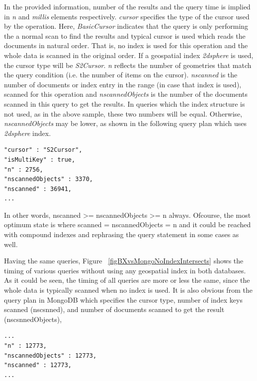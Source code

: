 \documentclass[a4paper,12pt]{article}
\begin{document}
In the provided information, number of the results and the query time is implied in \textit{n} and \textit{millis} elements respectively. \textit{cursor} specifies the type of the cursor used by the operation. Here, \textit{BasicCursor} indicates that the query is only performing the a normal scan to find the results and typical cursor is used which reads the documents in natural order. That is, no index is used for this operation and the whole data is scanned in the original order. If a geospatial index \textit{2dsphere} is used, the cursor type will be \textit{S2Cursor}. \textit{n} reflects the number of geometries that match the query condition (i.e. the number of items on the cursor). \textit{nscanned} is the number of documents or index entry in the range (in case that index is used), scanned for this operation and \textit{nscannedObjects} is the number of the documents scanned in this query to get the results. In queries which the index structure is not used, as in the above sample, these two numbers will be equal. Otherwise, \textit{nscannedObjects} may be lower, as shown in the following query plan which uses \textit{2dsphere} index. 

\begin{verbatim}
"cursor" : "S2Cursor",
"isMultiKey" : true,
"n" : 2756,
"nscannedObjects" : 3370,
"nscanned" : 36941,
...
\end{verbatim}

In other words, nscanned >= nscannedObjects >= n always. Ofcourse, the most optimum state is where scanned = nscannedObjects = n and it could be reached with compound indexes and rephrasing the query statement in some cases as well.

Having the same queries, Figure ~\ref{figBXvsMongoNoIndexIntersects} shows the timing of various queries without using any geospatial index in both databases. As it could be seen, the timing of all queries are more or less the same, since the whole data is typically scanned when no index is used. It is also obvious from the query plan in MongoDB which specifies the cursor type, number of index keys scanned (nscsnned), and number of documents scanned to get the result (nscsnnedObjects),
\begin{verbatim}
...
"n" : 12773,
"nscannedObjects" : 12773,
"nscanned" : 12773,
...
\end{verbatim}
\end{document}
